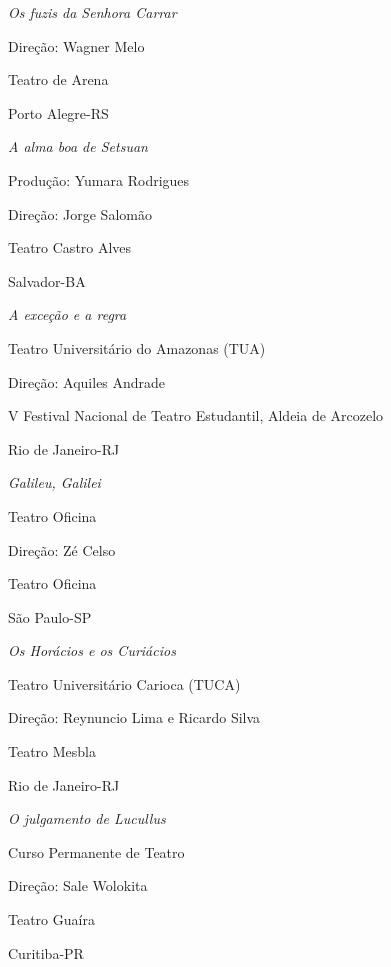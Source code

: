 \textit{Os fuzis da Senhora Carrar}

Direção: Wagner Melo

Teatro de Arena

Porto Alegre-RS

\textit{A alma boa de Setsuan}

Produção: Yumara Rodrigues

Direção: Jorge Salomão

Teatro Castro Alves

Salvador-BA

\textit{A exceção e a regra}

Teatro Universitário do Amazonas (TUA)

Direção: Aquiles Andrade

V Festival Nacional de Teatro Estudantil, Aldeia de Arcozelo

Rio de Janeiro-RJ

\textit{Galileu, Galilei}

Teatro Oficina

Direção: Zé Celso

Teatro Oficina

São Paulo-SP

\textit{Os Horácios e os Curiácios}

Teatro Universitário Carioca (TUCA)

Direção: Reynuncio Lima e Ricardo Silva

Teatro Mesbla

Rio de Janeiro-RJ

\textit{O julgamento de Lucullus}

Curso Permanente de Teatro

Direção: Sale Wolokita

Teatro Guaíra

Curitiba-PR

